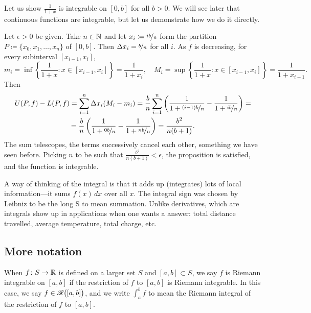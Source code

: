 \begin{example}
Let us show $\frac{1}{1+x}$ is integrable on $[0,b]$ for all $b > 0$.
We will see later that continuous functions are integrable, but let us
demonstrate how we do it directly.

Let $\epsilon > 0$ be given.  Take $n \in {\mathbb{N}}$ and
let $x_i \coloneqq \nicefrac{ib}{n}$ form the 
partition $P \coloneqq \{ x_0,x_1,\ldots,x_n \}$ of $[0,b]$.
Then $\Delta x_i = \nicefrac{b}{n}$ for all $i$.  
As $f$ is decreasing, for every subinterval $[x_{i-1},x_i]$,
\begin{equation*}
m_i = \inf \left\{ \frac{1}{1+x} : x \in [x_{i-1},x_i] \right\} = \frac{1}{1+x_i} ,
\quad
M_i = \sup \left\{ \frac{1}{1+x} : x \in [x_{i-1},x_i] \right\} =
\frac{1}{1+x_{i-1}} .
\end{equation*}
Then
\begin{multline*}
U(P,f)-L(P,f)
=
\sum_{i=1}^n
\Delta x_i
(M_i-m_i)
=
\frac{b}{n}
\sum_{i=1}^n 
\left( \frac{1}{1+\nicefrac{(i-1)b}{n}} - \frac{1}{1+\nicefrac{ib}{n}} \right) 
=
\\
=
\frac{b}{n}
\left( \frac{1}{1+\nicefrac{0b}{n}} - \frac{1}{1+\nicefrac{nb}{n}} \right) 
=
\frac{b^2}{n(b+1)} .
\end{multline*}
The sum telescopes, the terms successively cancel each other, something
we have seen before.
Picking $n$ to be such that
$\frac{b^2}{n(b+1)} < \epsilon$, the proposition is satisfied, and the
function is integrable.
\end{example}

\begin{remark}
A way of thinking of the integral is that it adds up (integrates) lots of
local information---it sums $f(x)\,dx$ over all $x$.
The integral sign was chosen by Leibniz to be the long S to mean summation.
Unlike derivatives, which are  
integrals show up in applications when
one wants a  answer: total distance travelled, average
temperature, total charge, etc.
\end{remark}

\subsection{More notation}

When $f \colon S \to {\mathbb{R}}$ is defined on a larger set $S$ and
$[a,b] \subset S$,
we say $f$ is Riemann integrable on $[a,b]$ if the restriction of $f$
to $[a,b]$ is Riemann integrable. 
In this case,
we say $f \in {\mathscr{R}}\bigl([a,b]\bigr)$,
and
we write $\int_a^b f$ to mean the Riemann integral
of the restriction of $f$ to $[a,b]$.

